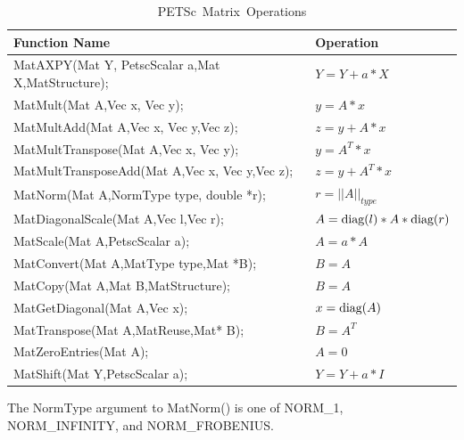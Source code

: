 \begin{table}[tb]
\begin{center}
\begin{tabular}{ll}
{\bf Function Name} & {\bf Operation} \\
\hline
MatAXPY(Mat Y, PetscScalar a,Mat X,MatStructure); & $ Y = Y + a*X $ \\
MatMult(Mat A,Vec x, Vec y); & $ y = A*x $ \\
MatMultAdd(Mat A,Vec x, Vec y,Vec z); & $ z = y + A*x $ \\
MatMultTranspose(Mat A,Vec x, Vec y); & $ y = A^{T}*x $ \\
MatMultTransposeAdd(Mat A,Vec x, Vec y,Vec z); & $ z = y + A^{T}*x $ \\
MatNorm(Mat A,NormType type,  double *r); & $ r = ||A||_{type}$ \\
MatDiagonalScale(Mat A,Vec l,Vec r); & $ A = \hbox{diag}(l)*A*\hbox{diag}(r) $ \\
MatScale(Mat A,PetscScalar a); & $ A = a*A $ \\
MatConvert(Mat A,MatType type,Mat *B); & $ B = A $ \\
MatCopy(Mat A,Mat B,MatStructure); &  $ B = A $ \\
MatGetDiagonal(Mat A,Vec x); & $ x = \hbox{diag}(A)$ \\
MatTranspose(Mat A,MatReuse,Mat* B); & $ B = A^{T} $ \\
MatZeroEntries(Mat A); & $ A = 0 $ \\
MatShift(Mat Y,PetscScalar a); & $ Y =  Y + a*I $ \\
\hline 
\end{tabular}
\end{center}
\caption{\hbox{PETSc Matrix Operations}}
\label{fig_matrixops}
\end{table}
The NormType argument to MatNorm() is one of 
NORM_1, NORM_INFINITY, and NORM_FROBENIUS.

  
